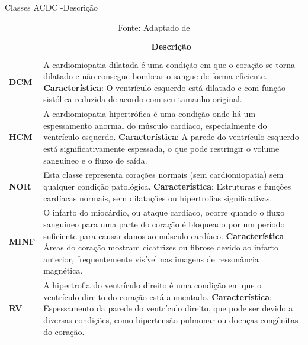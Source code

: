\begin{table}[H]
    \centering
    \caption{Classes ACDC -Descrição}
    \renewcommand{\arraystretch}{1} %
    \begin{tabular}{|>{\centering\arraybackslash}p{2cm}|p{12cm}|}
    \hline 
          \multicolumn{1}{|c|}{\textbf{Condição}} & \multicolumn{1}{c|}{\textbf{Descrição}} \\
          & \\
    \hline 
        \textbf{DCM} &
        A cardiomiopatia dilatada é uma condição em que o coração se 
        torna dilatado e não consegue bombear o sangue de forma
        eficiente. 
        \newline \newline
        \textbf{Característica}: O ventrículo esquerdo está dilatado e com função sistólica reduzida de acordo com seu tamanho original. \\ 
    \hline
        \textbf{HCM} & 
        A cardiomiopatia hipertrófica é uma condição onde há um espessamento anormal do músculo cardíaco, especialmente do ventrículo esquerdo. 
        \newline \newline
        \textbf{Característica}: A parede do ventrículo esquerdo está significativamente espessada, o que pode restringir o volume sanguíneo e o fluxo de saída. \\ 
    \hline
        \textbf{NOR} & 
        Esta classe representa corações normais (sem cardiomiopatia) sem qualquer condição patológica. 
        \newline \newline
        \textbf{Característica}: Estruturas e funções cardíacas normais, sem dilatações ou hipertrofias significativas. \\ 
    \hline
        \textbf{MINF} & 
        O infarto do miocárdio, ou ataque cardíaco, ocorre quando o fluxo sanguíneo para uma parte do coração é bloqueado por um período suficiente para causar danos ao músculo cardíaco. 
        \newline \newline
        \textbf{Característica}: Áreas do coração mostram cicatrizes ou fibrose devido ao infarto anterior, frequentemente visível nas imagens de ressonância magnética. \\ 
    \hline
        \textbf{RV} & 
        A hipertrofia do ventrículo direito é uma condição em que o ventrículo direito do coração está aumentado. 
        \newline \newline
        \textbf{Característica}: Espessamento da parede do ventrículo direito, que pode ser devido a diversas condições, como hipertensão pulmonar ou doenças congênitas do coração. \\
    \hline
    \end{tabular} 
    \caption*{Fonte: Adaptado de \cite{bernardDeepLearningTechniques2018a}}
    \label{tab:conditions}
\end{table}


